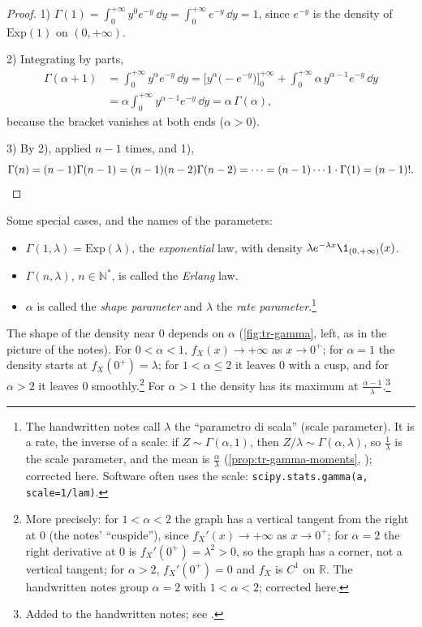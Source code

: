 \begin{proof}
1) $\Gamma(1)=\int_0^{+\infty}y^0e^{-y}\,\dd y=\int_0^{+\infty}e^{-y}\,\dd y=1$, since $e^{-y}$ is
the density of $\mathrm{Exp}(1)$ on $(0,+\infty)$.

2) Integrating by parts,
\[
\begin{aligned}
  \Gamma(\alpha+1)&=\int_0^{+\infty}y^\alpha e^{-y}\,\dd y
  =\Big[y^\alpha\big(-e^{-y}\big)\Big]_0^{+\infty}+\int_0^{+\infty}\alpha\,y^{\alpha-1}e^{-y}\,\dd y\\
  &=\alpha\int_0^{+\infty}y^{\alpha-1}e^{-y}\,\dd y=\alpha\,\Gamma(\alpha),
\end{aligned}
\]
because the bracket vanishes at both ends ($\alpha>0$).

3) By 2), applied $n-1$ times, and 1),
\[
  \Gamma(n)=(n-1)\Gamma(n-1)=(n-1)(n-2)\Gamma(n-2)=\dots=(n-1)\cdots1\cdot\Gamma(1)=(n-1)! .\qedhere
\]
\end{proof}

\begin{remark}\label{rem:tr-gamma-special}
Some special cases, and the names of the parameters:
\begin{itemize}
  \item $\Gamma(1,\lambda)=\mathrm{Exp}(\lambda)$, the \emph{exponential} law, with density
    $\lambda e^{-\lambda x}\1_{(0,+\infty)}(x)$.
  \item $\Gamma(n,\lambda)$, $n\in\mathbb N^*$, is called the \emph{Erlang} law.
  \item $\alpha$ is called the \emph{shape parameter} and $\lambda$ the \emph{rate
    parameter}.\footnote{The handwritten notes call $\lambda$ the ``parametro di scala'' (scale
    parameter). It is a rate, the inverse of a scale: if $Z\sim\Gamma(\alpha,1)$, then
    $Z/\lambda\sim\Gamma(\alpha,\lambda)$, so $\frac1\lambda$ is the scale parameter, and the mean
    is $\frac\alpha\lambda$ (\cref{prop:tr-gamma-moments}, ); corrected
    here. Software often uses the scale: \texttt{scipy.stats.gamma(a, scale=1/lam)}.}
\end{itemize}
The shape of the density near $0$ depends on $\alpha$ (\cref{fig:tr-gamma}, left, as in the
picture of the notes). For $0<\alpha<1$, $f_X(x)\to+\infty$ as $x\to0^+$; for $\alpha=1$ the
density starts at $f_X(0^+)=\lambda$; for $1<\alpha\le2$ it leaves $0$ with a cusp, and for
$\alpha>2$ it leaves $0$ smoothly.\footnote{More precisely: for $1<\alpha<2$ the graph has a
vertical tangent from the right at $0$ (the notes' ``cuspide''), since $f_X'(x)\to+\infty$ as
$x\to0^+$; for $\alpha=2$ the right derivative at $0$ is $f_X'(0^+)=\lambda^2>0$, so the graph has
a corner, not a vertical tangent; for $\alpha>2$, $f_X'(0^+)=0$ and $f_X$ is $C^1$ on $\mathbb R$.
The handwritten notes group $\alpha=2$ with $1<\alpha<2$; corrected here.} For $\alpha>1$ the
density has its maximum at $\frac{\alpha-1}\lambda$.\footnote{Added to the handwritten notes; see
.}
\end{remark}

